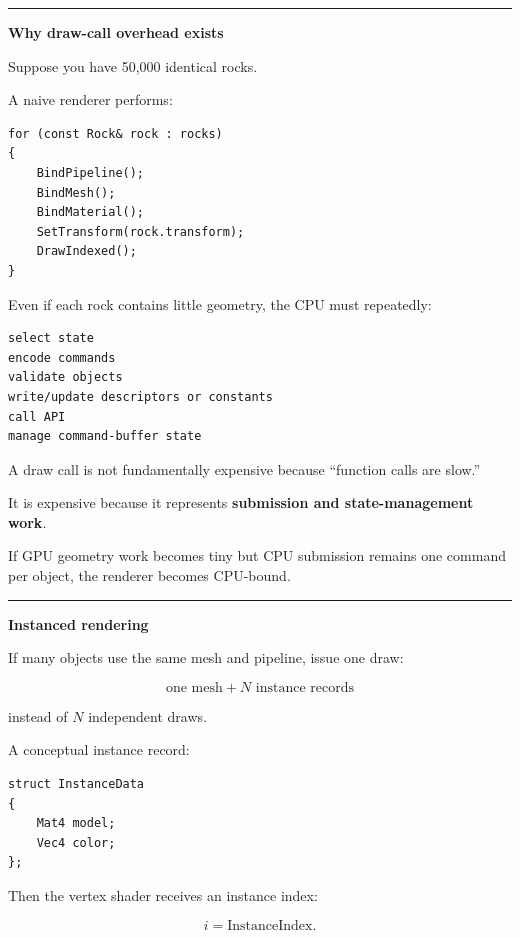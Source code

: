 \hypertarget{03-visual-computing-i-ch014-instancing-batching-indirect-drawing-gpu-culling-mesh-shaders-execution-cost-data-binding-psos-and-permutations}{}

\begin{center}\rule{0.5\linewidth}{0.5pt}\end{center}

\textbf{Why draw-call overhead exists}

Suppose you have 50,000 identical rocks.

A naive renderer performs:

\begin{verbatim}
for (const Rock& rock : rocks)
{
    BindPipeline();
    BindMesh();
    BindMaterial();
    SetTransform(rock.transform);
    DrawIndexed();
}
\end{verbatim}

Even if each rock contains little geometry, the CPU must repeatedly:

\begin{verbatim}
select state
encode commands
validate objects
write/update descriptors or constants
call API
manage command-buffer state
\end{verbatim}

A draw call is not fundamentally expensive because ``function calls are slow.''

It is expensive because it represents \textbf{submission and state-management work}.

If GPU geometry work becomes tiny but CPU submission remains one command per object, the renderer becomes CPU-bound.

\begin{center}\rule{0.5\linewidth}{0.5pt}\end{center}

\textbf{Instanced rendering}

If many objects use the same mesh and pipeline, issue one draw:

\[
\boxed{
\text{one mesh}
+
N\text{ instance records}
}
\]

instead of \(N\) independent draws.

A conceptual instance record:

\begin{verbatim}
struct InstanceData
{
    Mat4 model;
    Vec4 color;
};
\end{verbatim}

Then the vertex shader receives an instance index:

\[
i=\text{InstanceIndex}.
\]

